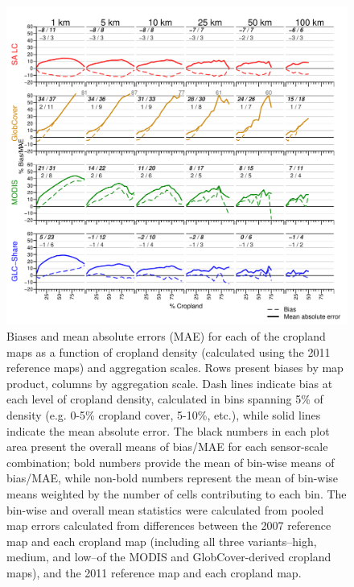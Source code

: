 \documentclass[12pt, titlepage]{article}
\begin{document}
\begin{figure}[!ht]
  \centering
     \includegraphics[width = 14cm]{figures/biases_1-100km.pdf} 
      \caption{Biases and mean absolute errors (MAE) for each of the cropland maps as a function of cropland density (calculated using the 2011 reference maps) and aggregation scales. Rows present biases by map product, columns by aggregation scale.  Dash lines indicate bias at each level of cropland density, calculated in bins spanning 5\% of density (e.g. 0-5\% cropland cover, 5-10\%, etc.), while solid lines indicate the mean absolute error.  The black numbers in each plot area present the overall means of bias/MAE for each sensor-scale combination; bold numbers provide the mean of bin-wise means of bias/MAE, while non-bold numbers represent the mean of bin-wise means weighted by the number of cells contributing to each bin. The bin-wise and overall mean statistics were calculated from pooled map errors calculated from differences between the 2007 reference map and each cropland map (including all three variants--high, medium, and low--of the MODIS and GlobCover-derived cropland maps), and the 2011 reference map and each cropland map. }
      \label{fig:bias1-100}
\end{figure}

\end{document}
